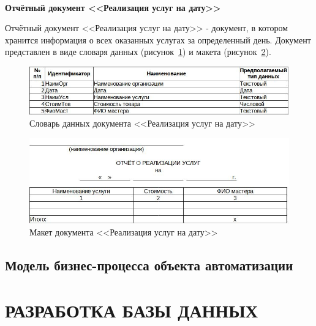 \documentclass[12pt, a4paper, simple]{eskdtext}
\begin{document}
    \newpage
    \paragraph{} \textbf{Отчётный документ <<Реализация услуг на дату>>}

    Отчётный документ <<Реализация услуг на дату>>
    - документ, в котором хранится информация о всех оказанных услугах за определенный день.
    Документ представлен в виде словаря данных (рисунок~\ref{fig:OT_RealizYslNaDaty_tipi})
    и макета (рисунок~\ref{fig:OT_RealizYslNaDaty_maket}).

    \begin{figure}[!h]
        \centering
        \includegraphics[width=14cm]
            {_docs/ОТ_РеализУслНаДату_типы.jpg}
        \caption{Словарь данных документа <<Реализация услуг на дату>>}
        \label{fig:OT_RealizYslNaDaty_tipi}
    \end{figure}

    \begin{figure}[!h]
        \centering
        \includegraphics[width=14cm]
            {_docs/ОТ_РеализУслНаДату_макет.jpg}
        \caption{Макет документа <<Реализация услуг на дату>>}
        \label{fig:OT_RealizYslNaDaty_maket}
    \end{figure}

    \newpage
    
    \subsection{Модель бизнес-процесса объекта автоматизации}
    \newpage

    \section{РАЗРАБОТКА БАЗЫ ДАННЫХ}
\end{document}

